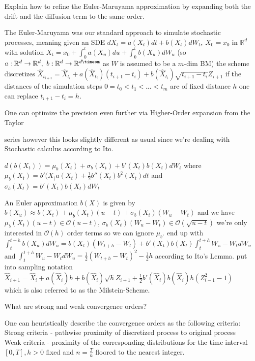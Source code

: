 Explain how to refine the Euler-Maruyama approximation by expanding both the
drift and the diffusion term to the same order.

The Euler-Maruyama was our standard approach to simulate stochastic processes,
meaning given an SDE 
\( dX_t = a(X_t) dt + b(X_t) dW_t,\ X_0 = x_0 \) in \( \mathbb{R}^{d} \)
with solution
\( X_t = x_0 + \int_{0}^{t} a(X_u) du + \int_{0}^t b(X_u) dW_u \)
(so \( a : \mathbb{R}^{d} \to \mathbb{R}^{d},\ b : \mathbb{R}^{d} \to \mathbb{R}^{d\timesm}\)
as \( W \) is assumed to be a \( m \)-dim BM) the scheme discretizes 
\( \hat{X}_{t_{i+1}} = \hat{X}_{t_i} + a(\hat{X}_{t_i})(t_{i+1} - t_i) + b(\hat{X}_{t_i})\sqrt{t_{i+1} - t_i}Z_{i+1}\)
if the distances of the simulation steps \( 0 = t_0 < t_1 < \dots < t_m \) are of fixed distance \( h \) one can replace
\( t_{i+1} - t_i = h \).

One can optimize the precision even further via Higher-Order expansion from the Taylor

series however this looks slightly different as usual since we're dealing with Stochastic calculus
according to Ito.

\( d(b(X_t)) = \mu_b(X_t) + \sigma_b(X_t)  + b'(X_t)b(X_t) dW_t \)
where \( \mu_b(X_t) = b'(X_)a(X_t) + \frac{1}{2}b''(X_t)b^2(X_t)dt \)
and \( \sigma_b(X_t) = b'(X_t)b(X_t) dW_t \)

An Euler approximation \( b(X) \) is given by
\( b(X_u) \approx b(X_t) + \mu_b(X_t)(u - t) + \sigma_b(X_t)(W_u - W_t) \)
and we have \( \mu_b(X_t)(u - t) \in \mathcal{O}(u - t) \), \(\sigma_b(X_t)(W_u - W_t) \in \mathcal{O}(\sqrt{u - t}) \)
we're only interested in \( \mathcal{O}(h) \) order terms so we can ignore \( \mu_b \).
end up with
\( \int_{t}^{t+h} b(X_u) dW_u = b(X_t)(W_{t+h} - W_t) + b'(X_t)b(X_t)\int_{t}^{t+h} W_u - W_t dW_u \)
and \( \int_{t}^{t+h} W_u - W_t dW_u  = \frac{1}{2}(W_{t+h} - W_t)^2 - \frac{1}{2}h\) according to Ito's Lemma.
put into sampling notation 
\( \hat{X}_{i+1} = \hat{X}_i + a(\hat{X}_i)h + b(\hat{X}_i)\sqrt{h}Z_{i+1} + \frac{1}{2}b'(\hat{X}_i)b(\hat{X}_i)h(Z^2_{i-1} - 1) \)
which is also referred to as the Milstein-Scheme.

What are strong and weak convergence orders?

One can heuristically describe the convergence orders as the following criteria:
Strong criteria
- pathwise proximity of discretized process to original process
Weak criteria
- proximity of the corresponding distributions
for the time interval \( [0, T], h > 0 \) fixed and \( n = \frac{T}{h} \) floored to the nearest integer.

